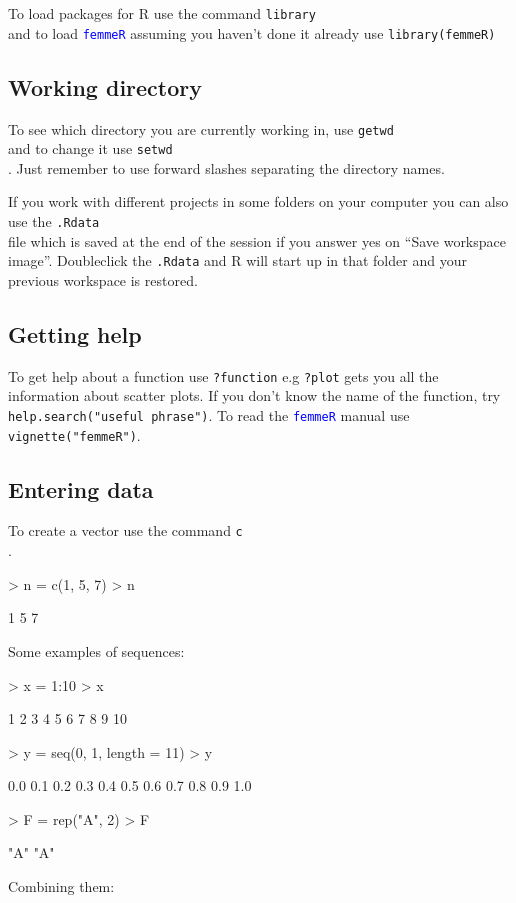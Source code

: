 \documentclass{scrartcl}
\newcommand{\Rcode}[1]{\texttt{\textcolor{blue}{#1}}}
\newcommand{\R}{\textsf{R}}
\newcommand{\fn}[1]{\texttt{#1}\index{#1}\\}
\begin{document}
To load packages for \R{} use the command \fn{library} and to load
\Rcode{femmeR} assuming you haven't done it already use \texttt{library(femmeR)}


\subsection{Working directory}

To see which directory you are currently working in, use \fn{getwd}
and to change it use \fn{setwd}. Just remember to use forward slashes
separating the directory names.

If you work with different projects in some folders on your computer
you can also use the \fn{.Rdata} file which is saved at the end of the
session if you answer yes on ``Save workspace image''. Doubleclick the
\texttt{.Rdata} and \R{} will start up in that folder and your previous
workspace is restored.

\subsection{Getting help}
\label{sec:getting-help}

To get help about a function use \texttt{?function} e.g \texttt{?plot}
gets you all the information about scatter plots. If you don't know
the name of the function, try \mbox{\texttt{help.search("useful
    phrase")}}. To read the \Rcode{femmeR} manual use
\texttt{vignette("femmeR")}.

\subsection{Entering data}
\label{sec:data}

To create a vector use the command \fn{c}.
\begin{Schunk}
\begin{Sinput}
> n = c(1, 5, 7)
> n
\end{Sinput}
\begin{Soutput}
[1] 1 5 7
\end{Soutput}
\end{Schunk}
Some examples of sequences:

\begin{Schunk}
\begin{Sinput}
> x = 1:10
> x
\end{Sinput}
\begin{Soutput}
 [1]  1  2  3  4  5  6  7  8  9 10
\end{Soutput}
\begin{Sinput}
> y = seq(0, 1, length = 11)
> y
\end{Sinput}
\begin{Soutput}
 [1] 0.0 0.1 0.2 0.3 0.4 0.5 0.6 0.7 0.8 0.9 1.0
\end{Soutput}
\begin{Sinput}
> F = rep("A", 2)
> F
\end{Sinput}
\begin{Soutput}
[1] "A" "A"
\end{Soutput}
\end{Schunk}
Combining them:
\end{document}
